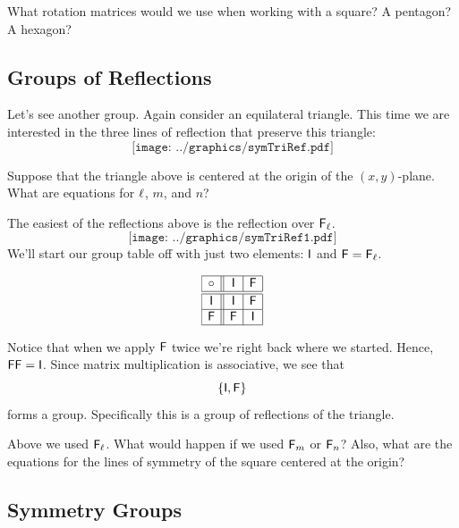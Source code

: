 \documentclass{ximera}
\begin{document}
\begin{ques} 
What rotation matrices would we use when working with a square?  A
pentagon?  A hexagon?
\end{ques}
\QM


\subsection{Groups of Reflections}

Let's see another group. Again consider an equilateral triangle.  This
time we are interested in the three lines of reflection that preserve
this triangle:
\[
\texttt{[image: ../graphics/symTriRef.pdf]}
\]

\begin{ques}
Suppose that the triangle above is centered at the origin of the
$(x,y)$-plane. What are equations for $\ell$, $m$,
and $n$?
\end{ques}
\QM

The easiest of the reflections above is the reflection over
$\mathsf{F}_{\ell}$.
\[
\texttt{[image: ../graphics/symTriRef1.pdf]}
\]
We'll start our group table off with just two elements: $\mathsf{I}$ and
$\mathsf{F}=\mathsf{F}_{\ell}$.

\[
\begin{array}{| c || c | c |}\hline
\circ & \mathsf{I} & \mathsf{F} \\ \hline\hline
\mathsf{I} & \mathsf{I} & \mathsf{F} \\\hline
\mathsf{F} & \mathsf{F} & \mathsf{I} \\ \hline
\end{array}
\]

Notice that when we apply $\mathsf{F}$ twice we're right back where we
started. Hence, $\mathsf{F} \mathsf{F} = \mathsf{I}$. Since matrix
multiplication is associative, we see that
\[
\{ \mathsf{I}, \mathsf{F} \}
\]
forms a group. Specifically this is a group of reflections of the
triangle.

\begin{ques} 
Above we used $\mathsf{F}_\ell$. What would happen if we used $\mathsf{F}_m$
or $\mathsf{F}_n$? Also, what are the equations for the lines of symmetry
of the square centered at the origin?
\end{ques}
\QM







\subsection{Symmetry Groups}
\end{document}
